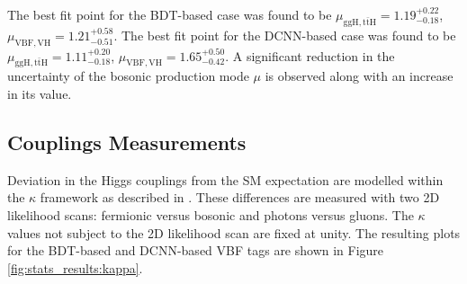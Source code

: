 The best fit point for the BDT-based case was found to be $\mu_{\mathrm{ggH},\mathrm{t\bar{t}H}} = 1.19^{+0.22}_{-0.18}$, $\mu_{\mathrm{VBF},\mathrm{VH}} = 1.21^{+0.58}_{-0.51}$.
The best fit point for the DCNN-based case was found to be $\mu_{\mathrm{ggH},\mathrm{t\bar{t}H}} = 1.11^{+0.20}_{-0.18}$, $\mu_{\mathrm{VBF},\mathrm{VH}} = 1.65^{+0.50}_{-0.42}$.
A significant reduction in the uncertainty of the bosonic production mode $\mu$ is observed along with an increase in its value.





\subsection{Couplings Measurements}
Deviation in the Higgs couplings from the SM expectation are modelled within the $\kappa$ framework as described in \cite{Kappa}.
These differences are measured with two 2D likelihood scans: fermionic versus bosonic and photons versus gluons.
The $\kappa$ values not subject to the 2D likelihood scan are fixed at unity.
The resulting plots for the BDT-based and DCNN-based VBF tags are shown in Figure \ref{fig:stats_results:kappa}.

